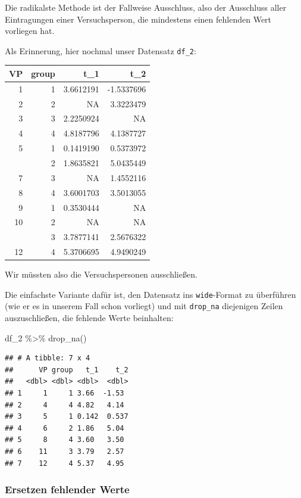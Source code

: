 \documentclass[
]{book}
\newenvironment{Shaded}{\begin{snugshade}}{\end{snugshade}}
\newcommand{\FunctionTok}[1]{\textcolor[rgb]{0.00,0.00,0.00}{#1}}
\newcommand{\NormalTok}[1]{#1}
\newcommand{\SpecialCharTok}[1]{\textcolor[rgb]{0.00,0.00,0.00}{#1}}
\begin{document}
Die radikalste Methode ist der Fallweise Ausschluss, also der Ausschluss aller Eintragungen einer Versuchsperson, die mindestens einen fehlenden Wert vorliegen hat.

Als Erinnerung, hier nochmal unser Datensatz \texttt{df\_2}:

\begin{tabular}[t]{rrrr}
\toprule
VP & group & t\_1 & t\_2\\
\midrule
1 & 1 & 3.6612191 & -1.5337696\\
2 & 2 & NA & 3.3223479\\
3 & 3 & 2.2250924 & NA\\
4 & 4 & 4.8187796 & 4.1387727\\
5 & 1 & 0.1419190 & 0.5373972\\
\addlinespace
6 & 2 & 1.8635821 & 5.0435449\\
7 & 3 & NA & 1.4552116\\
8 & 4 & 3.6001703 & 3.5013055\\
9 & 1 & 0.3530444 & NA\\
10 & 2 & NA & NA\\
\addlinespace
11 & 3 & 3.7877141 & 2.5676322\\
12 & 4 & 5.3706695 & 4.9490249\\
\bottomrule
\end{tabular}

Wir müssten also die Versuchspersonen ausschließen.

Die einfachste Variante dafür ist, den Datensatz ins \texttt{wide}-Format zu überführen (wie er es in unserem Fall schon vorliegt) und mit \texttt{drop\_na} diejenigen Zeilen auszuschließen, die fehlende Werte beinhalten:

\begin{Shaded}
\begin{Highlighting}[]
\NormalTok{df\_2 }\SpecialCharTok{\%\textgreater{}\%} 
  \FunctionTok{drop\_na}\NormalTok{()}
\end{Highlighting}
\end{Shaded}

\begin{verbatim}
## # A tibble: 7 x 4
##      VP group   t_1    t_2
##   <dbl> <dbl> <dbl>  <dbl>
## 1     1     1 3.66  -1.53 
## 2     4     4 4.82   4.14 
## 3     5     1 0.142  0.537
## 4     6     2 1.86   5.04 
## 5     8     4 3.60   3.50 
## 6    11     3 3.79   2.57 
## 7    12     4 5.37   4.95
\end{verbatim}

\hypertarget{ersetzen-fehlender-werte}{%
\subsubsection{Ersetzen fehlender Werte}\label{ersetzen-fehlender-werte}}
\end{document}
